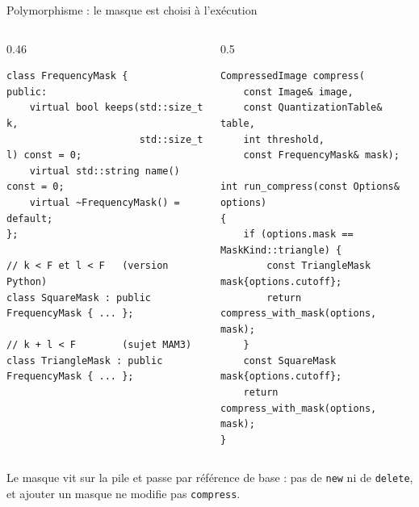 \documentclass[aspectratio=169,10pt]{beamer}
\newcommand{\code}[1]{\texttt{#1}}
\begin{document}
\begin{frame}[fragile]{Polymorphisme : le masque est choisi à l'exécution}
  \begin{columns}[T]
    \begin{column}{0.46\textwidth}
\begin{lstlisting}
class FrequencyMask {
public:
    virtual bool keeps(std::size_t k,
                       std::size_t l) const = 0;
    virtual std::string name() const = 0;
    virtual ~FrequencyMask() = default;
};

// k < F et l < F   (version Python)
class SquareMask : public FrequencyMask { ... };

// k + l < F        (sujet MAM3)
class TriangleMask : public FrequencyMask { ... };
\end{lstlisting}
    \end{column}
    \begin{column}{0.5\textwidth}
\begin{lstlisting}
CompressedImage compress(
    const Image& image,
    const QuantizationTable& table,
    int threshold,
    const FrequencyMask& mask);

int run_compress(const Options& options)
{
    if (options.mask == MaskKind::triangle) {
        const TriangleMask mask{options.cutoff};
        return compress_with_mask(options, mask);
    }
    const SquareMask mask{options.cutoff};
    return compress_with_mask(options, mask);
}
\end{lstlisting}
    \end{column}
  \end{columns}
  \vspace{0.3em}
  \small Le masque vit sur la pile et passe par référence de base : pas de \code{new} ni de
  \code{delete}, et ajouter un masque ne modifie pas \code{compress}.
\end{frame}
\end{document}
